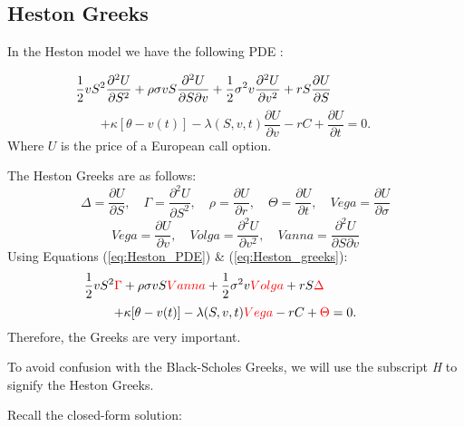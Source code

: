 \documentclass[a4paper]{article}
\begin{document}
\subsection{Heston Greeks}

In the Heston model we have the following PDE \cite{Heston_1993}:

\begin{equation*}
	\hspace{-50pt} \frac{1}{2}vS^2\frac{\partial^2 U}{\partial S^2} + \rho \sigma vS\frac{\partial^2 U}{\partial S \partial v} + \frac{1}{2} \sigma^2 v \frac{\partial^2 U}{\partial v^2} + rS\frac{\partial U}{\partial S}
\end{equation*}
\begin{equation}
	+ {\kappa [\theta-v(t)] - \lambda(S,v,t)}\frac{\partial U}{\partial v} -rC + \frac{\partial U}{\partial t} = 0.
	\label{eq:Heston_PDE}
\end{equation}
Where $U$ is the price of a European call option.

The Heston Greeks are as follows:
\begin{equation*}
	\Delta = \frac{\partial U}{\partial S}, \quad \Gamma = \frac{\partial^2 U}{\partial S^2}, \quad \rho = \frac{\partial U}{\partial r}, \quad \Theta = \frac{\partial U}{\partial t}, \quad Vega = \frac{\partial U}{\partial \sigma}
\end{equation*}
\begin{equation}
	Vega = \frac{\partial U}{\partial v}, \quad Volga = \frac{\partial^2 U}{\partial v^2}, \quad Vanna = \frac{\partial^2 U}{\partial S \partial v}
	\label{eq:Heston_greeks}
\end{equation}
Using Equations (\ref{eq:Heston_PDE}) \& (\ref{eq:Heston_greeks}):
\begin{equation*}
	\hspace{-50pt} \frac{1}{2}vS^2\textcolor{red}{\Gamma} + \rho \sigma vS\textcolor{red}{Vanna} + \frac{1}{2} \sigma^2 v \textcolor{red}{Volga} + rS\textcolor{red}{\Delta}
\end{equation*}
\begin{equation}
	+ {\kappa [\theta-v(t)] - \lambda(S,v,t)}\textcolor{red}{Vega} -rC + \textcolor{red}{\Theta} = 0.
\end{equation}
Therefore, the Greeks are very important. 

To avoid confusion with the Black-Scholes Greeks, we will use the subscript \textit{H} to signify the Heston Greeks. 

Recall the closed-form solution:
\end{document}
